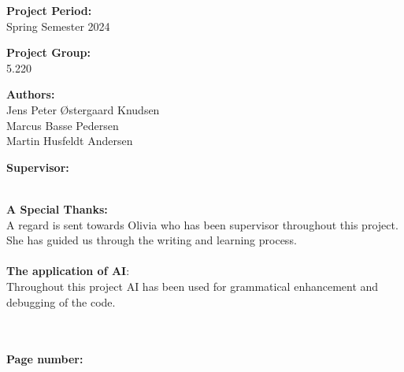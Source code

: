 \begin{titlepage}
\begin{minipage}[t]{0.48\textwidth}

\textbf{Project Period:} \\[5pt] \hspace*{2ex}
\hspace*{-13pt}Spring Semester 2024 \\\hspace*{2ex}

\textbf{Project Group:} \\[5pt]\bigskip\hspace{2ex}
\hspace*{-13pt}5.220	

\textbf{Authors:} \\[5pt]\hspace*{2ex}\hspace*{-13pt}
Jens Peter Østergaard Knudsen \\ \hspace*{2ex}
\hspace*{-13pt}Marcus Basse Pedersen \\\hspace*{2ex}
\hspace*{-13pt}Martin Husfeldt Andersen \\\hspace*{2ex}
\space 

\textbf{Supervisor:} \\[5pt]\hspace*{2ex}\hspace*{-13pt} 
 \hspace*{-13pt}
 \\\hspace*{2ex}
 
 \textbf{A Special Thanks:}\\
 A regard is sent towards Olivia who has been supervisor throughout this project. She has guided us through the writing and learning process.
 \\[5pt]\hspace*{2ex}\hspace*{-13pt}\\
 
\textbf{The application of AI}:\\
Throughout this project AI has been used for grammatical enhancement and debugging of the code.

 \hspace*{-13pt}
 \\\hspace*{2ex}\\
\textbf{Page number: \pageref{LastPage}
} \\ 



\end{minipage}
\end{titlepage}
